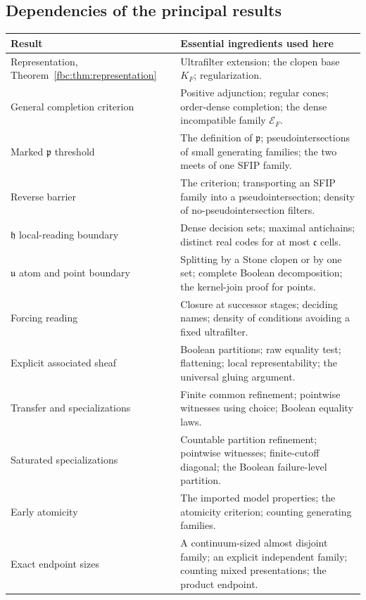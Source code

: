 \documentclass[11pt,letterpaper]{article}
\theoremstyle{definition}
\theoremstyle{remark}
\newcommand{\cp}{\mathfrak p}
\newcommand{\cu}{\mathfrak u}
\newcommand{\cc}{\mathfrak c}
\newcommand{\ch}{\mathfrak h}
\newcommand{\cE}{\mathcal E}
\begin{document}
\subsection{Dependencies of the principal results}
\begin{center}
\small
\begin{tabular}{@{}p{}p{}@{}}
\toprule
Result & Essential ingredients used here\\
\midrule
Representation, Theorem~\ref{fbc:thm:representation} & Ultrafilter
extension; the clopen base $K_F$; regularization.\\[0.3em]
General completion criterion & Positive adjunction; regular cones;
order-dense completion; the dense incompatible family $\cE_F$.\\[0.3em]
Marked $\cp$ threshold & The definition of $\cp$; pseudointersections of
small generating families; the two meets of one SFIP family.\\[0.3em]
Reverse barrier & The criterion; transporting an SFIP family into a
pseudointersection; density of no-pseudointersection filters.\\[0.3em]
$\ch$ local-reading boundary & Dense decision sets; maximal antichains;
distinct real codes for at most $\cc$ cells.\\[0.3em]
$\cu$ atom and point boundary & Splitting by a Stone clopen or by one
set; complete Boolean decomposition; the kernel-join proof for
points.\\[0.3em]
Forcing reading & Closure at successor stages; deciding names; density
of conditions avoiding a fixed ultrafilter.\\[0.3em]
Explicit associated sheaf & Boolean partitions; raw equality test;
flattening; local representability; the universal gluing argument.\\[0.3em]
Transfer and specializations & Finite common refinement; pointwise
witnesses using choice; Boolean equality laws.\\[0.3em]
Saturated specializations & Countable partition refinement; pointwise
witnesses; finite-cutoff diagonal; the Boolean failure-level
partition.\\[0.3em]
Early atomicity & The imported model properties; the atomicity criterion;
counting generating families.\\[0.3em]
Exact endpoint sizes & A continuum-sized almost disjoint family; an
explicit independent family; counting mixed presentations; the product
endpoint.\\
\bottomrule
\end{tabular}
\end{center}
\end{document}
